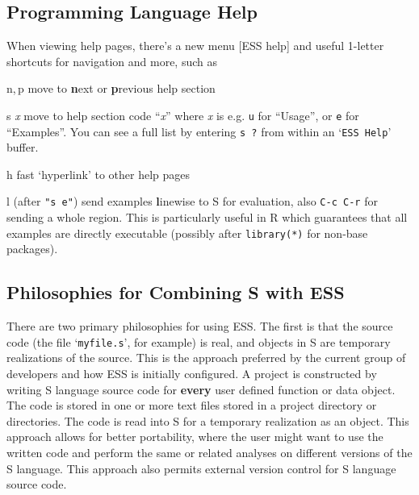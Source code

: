 \documentclass{article}
\newcommand{\stexttt}[1]{{\small\texttt{#1}}}
\newcommand{\file}[1]{`\stexttt{#1}'}
\begin{document}
\subsection{Programming Language Help}
\label{sec:S:help}

When viewing help pages, there's a new menu \textsf{[ESS help]} and
useful 1-letter shortcuts for navigation and more, such as
\begin{list}{}{\renewcommand{\makelabel}[1]{\bf#1\hfill}}
\item[n,\,p] move to \textbf{n}ext or \textbf{p}revious help section
\item[{s \textit{x}}] move to help section code ``\textit{x}'' where
  \textit{x} is e.g. \stexttt{u} for ``Usage'', or \stexttt{e} for
  ``Examples''.  You can see a full list by entering \stexttt{s ?} from within
an \file{ESS Help} buffer.
\item[h] fast `hyperlink' to other help pages
\item[l] (after \stexttt{"s e"}) send examples \textbf{l}inewise to S for
  evaluation, also \stexttt{C-c C-r} for sending a whole region.  This 
  is particularly useful in R which guarantees that all examples are
  directly executable (possibly after \stexttt{library(*)} for non-base
  packages).
\end{list}

\subsection{Philosophies for Combining S with ESS}
\label{sec:S:philosophy}

There are two primary philosophies for using ESS.  The first is that
the source code (the file \file{myfile.s}, for example) is real,
and objects in S are temporary realizations of the source.  This is
the approach preferred by the current group of developers and how ESS
is initially configured.  A project is constructed by writing S
language source code for \textbf{every} user defined function or data
object.  The code is stored in one or more text files stored in a
project directory or directories.  The code is read into S for a
temporary realization as an object.  This approach allows for better
portability, where the user might want to use the written code and
perform the same or related analyses on different versions of the S
language.  This approach also permits external version control for
S language source code.
\end{document}
